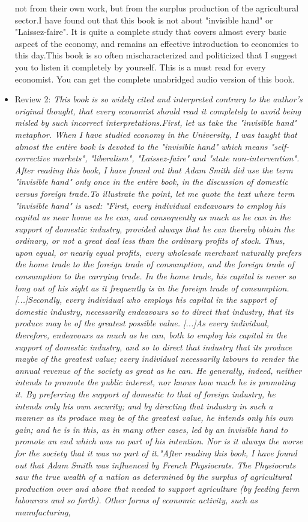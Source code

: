 \documentclass[12pt, a4paper]{article}
\begin{document}
\begin{itemize}
{not from their own work, but from the surplus production of the agricultural sector.I have found out that this book is not about "invisible hand" or "Laissez-faire". It is quite a complete study that covers almost every basic aspect of the economy, and remains an effective introduction to economics to this day.This book is so often mischaracterized and politicized that I suggest you to listen it completely by yourself. This is a must read for every economist. You can get the complete unabridged audio version of this book.}
    \item Review 2: \textit{This book is so widely cited and interpreted contrary to the author's original thought, that every economist should read it completely to avoid being misled by such incorrect interpretations.First, let us take the "invisible hand" metaphor. When I have studied economy in the University, I was taught that almost the entire book is devoted to the "invisible hand" which means "self-corrective markets", "liberalism", "Laissez-faire" and "state non-intervention". After reading this book, I have found out that Adam Smith did use the term "invisible hand" only once in the entire book, in the discussion of domestic versus foreign trade.To illustrate the point, let me quote the text where term "invisible hand" is used: "First, every individual endeavours to employ his capital as near home as he can, and consequently as much as he can in the support of domestic industry, provided always that he can thereby obtain the ordinary, or not a great deal less than the ordinary profits of stock. Thus, upon equal, or nearly equal profits, every wholesale merchant naturally prefers the home trade to the foreign trade of consumption, and the foreign trade of consumption to the carrying trade. In the home trade, his capital is never so long out of his sight as it frequently is in the foreign trade of consumption. [...]Secondly, every individual who employs his capital in the support of domestic industry, necessarily endeavours so to direct that industry, that its produce may be of the greatest possible value. [...]As every individual, therefore, endeavours as much as he can, both to employ his capital in the support of domestic industry, and so to direct that industry that its produce maybe of the greatest value; every individual necessarily labours to render the annual revenue of the society as great as he can. He generally, indeed, neither intends to promote the public interest, nor knows how much he is promoting it. By preferring the support of domestic to that of foreign industry, he intends only his own security; and by directing that industry in such a manner as its produce may be of the greatest value, he intends only his own gain; and he is in this, as in many other cases, led by an invisible hand to promote an end which was no part of his intention. Nor is it always the worse for the society that it was no part of it."After reading this book, I have found out that Adam Smith was influenced by French Physiocrats. The Physiocrats saw the true wealth of a nation as determined by the surplus of agricultural production over and above that needed to support agriculture (by feeding farm labourers and so forth). Other forms of economic activity, such as manufacturing, }
\end{itemize}
\end{document}
